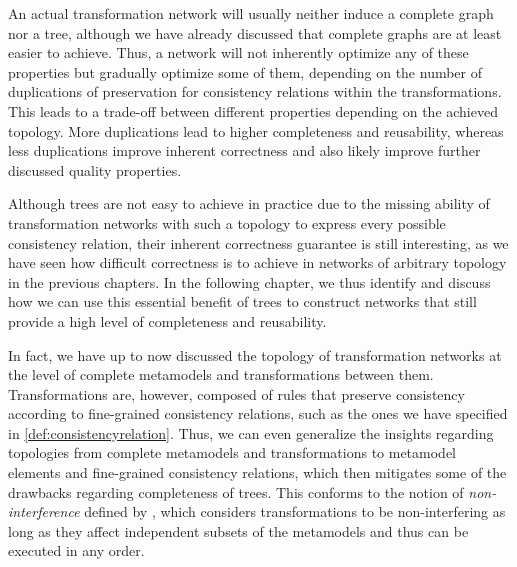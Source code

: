 An actual transformation network will usually neither induce a complete graph nor a tree, although we have already discussed that complete graphs are at least easier to achieve.
Thus, a network will not inherently optimize any of these properties but gradually optimize some of them, depending on the number of duplications of preservation for consistency relations within the transformations.
This leads to a trade-off between different properties depending on the achieved topology.
More duplications lead to higher completeness and reusability, whereas less duplications improve inherent correctness and also likely improve further discussed quality properties. %

Although trees are not easy to achieve in practice due to the missing ability of transformation networks with such a topology to express every possible consistency relation, their inherent correctness guarantee is still interesting, as we have seen how difficult correctness is to achieve in networks of arbitrary topology in the previous chapters.
In the following chapter, we thus identify and discuss how we can use this essential benefit of trees to construct networks that still provide a high level of completeness and reusability.

In fact, we have up to now discussed the topology of transformation networks at the level of complete metamodels and transformations between them.
Transformations are, however, composed of rules that preserve consistency according to fine-grained consistency relations, such as the ones we have specified in \autoref{def:consistencyrelation}.
Thus, we can even generalize the insights regarding topologies from complete metamodels and transformations to metamodel elements and fine-grained consistency relations, which then mitigates some of the drawbacks regarding completeness of trees.
This conforms to the notion of \emph{non-interference} defined by \textcite{stevens2020BidirectionalTransformationLarge-SoSym}, which considers transformations to be non-interfering as long as they affect independent subsets of the metamodels and thus can be executed in any order.



